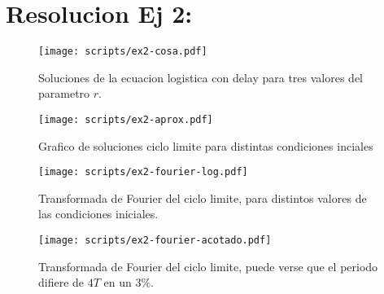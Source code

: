 \documentclass[twocolumn,aps,prl]{revtex4-1}
\begin{document}

% 

\section{Resolucion Ej 2:}

\begin{figure}[ht!]
    \centering
        \centering
        \texttt{[image: scripts/ex2-cosa.pdf]}
        \caption{Soluciones de la ecuacion logistica con delay para tres valores del parametro $r$.}
        \label{fig:scripts/ex2-cosa}
\end{figure}

\begin{figure}[ht!]
    \centering
        \centering
        \texttt{[image: scripts/ex2-aprox.pdf]} 
        \caption{Grafico de soluciones ciclo limite para distintas condiciones inciales}
        \label{fig:scripts/ex2-aprox}
\end{figure}

\begin{figure}[ht!]
    \centering
        \centering
        \texttt{[image: scripts/ex2-fourier-log.pdf]}
        \caption{Transformada de Fourier del ciclo limite, para distintos valores de las condiciones iniciales.}
        \label{fig:scripts/ex2-fourier-log}
\end{figure}

\begin{figure}[ht!]
    \centering
        \centering
        \texttt{[image: scripts/ex2-fourier-acotado.pdf]}
        \caption{Transformada de Fourier del ciclo limite, puede verse que el periodo difiere de $4T$ en un 3\%.}
        \label{fig:scripts/ex2-fourier-acotado}
\end{figure}
\end{document}
